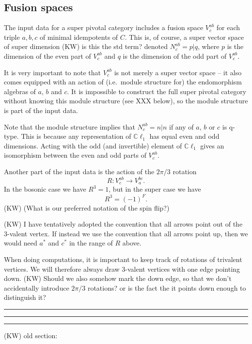 \documentclass[12pt,a4paper]{article}
\newcounter{arrow}
\newcommand\be            {\begin{equation}}
\newcommand\ee            {\end{equation}}
\newcommand{\cl}{\mathbb{C}\ell}
\newcommand{\kw}[1]{{\color{kwcolor}\footnotesize{(KW) #1}}}
\newcommand{\kwsep}{\bigskip\hrule\medskip\hrule\medskip\hrule\bigskip}
\begin{document}
\subsection{Fusion spaces} \label{fusion_spaces}

The input data for a super pivotal category includes a fusion space $V^{ab}_c$ for each triple $a,b,c$ of minimal idempotents
of $C$.
This is, of course, a super vector space of super dimension \kw{is this the std term?} 
denoted $N^{ab}_c = p|q$, where $p$ is the dimension of the even part
of $V^{ab}_c$ and $q$ is the dimension of the odd part of $V^{ab}_c$.

It is very important to note that $V^{ab}_c$ is not merely a super vector space -- it also comes equipped with an action
of (i.e.\ module structure for) the endomorphism algebras of $a$, $b$ and $c$.
It is impossible to construct the full super pivotal category without knowing this module structure (see XXX below), 
so the module
structure is part of the input data.

Note that the module structure implies that $N^{ab}_c = n|n$ if any of $a$, $b$ or $c$ is q-type.
This is because any representation of $\cl_1$ has equal even and odd dimensions.
Acting with the odd (and invertible) element of $\cl_1$ gives an isomorphism between the even and odd parts of $V^{ab}_c$.

Another part of the input data is the action of the $2\pi/3$ rotation
\be
	R : V^{ab}_c \to V^{bc}_a .
\ee
In the bosonic case we have $R^3 = 1$, but in the super case we have
\be
	R^3 = (-1)^F .
\ee
\kw{(What is our preferred notation of the spin flip?)}

\kw{I have tentatively adopted the convention that all arrows point out of the 3-valent vertex.
If instead we use the convention that all arrows point up, then we would need $a^*$ and $c^*$ in the range of $R$ above.}

When doing computations, it is important to keep track of rotations of trivalent vertices.
We will therefore always draw 3-valent vertices with one edge pointing down.
\kw{Should we also somehow mark the down edge, so that we don't accidentally introduce $2\pi/3$ rotations?
or is the fact the it points down enough to distinguish it?}

\kwsep

\kw{old section:}
\end{document}
